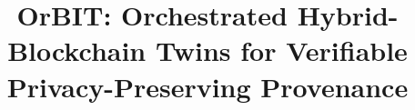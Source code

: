 \documentclass[final,5p,times,twocolumn]{elsarticle}
\begin{document}
\begin{frontmatter}



\title{OrBIT: Orchestrated Hybrid-Blockchain Twins for Verifiable Privacy-Preserving Provenance}





\end{frontmatter}
\end{document}
